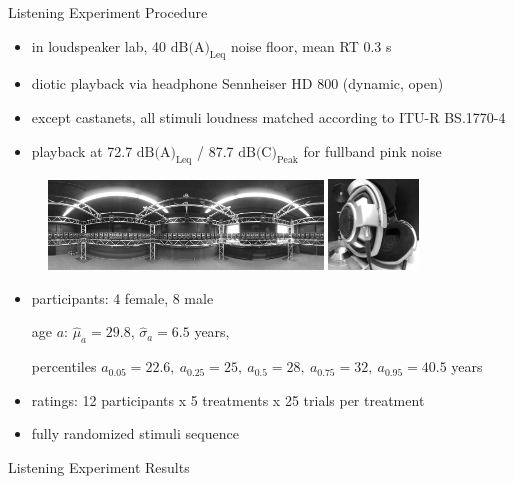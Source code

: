 \documentclass[mathserif]{intbeamer}
\begin{document}
\begin{frame}{Listening Experiment Procedure}
\begin{itemize}
\item in loudspeaker lab, 40 $\text{dB(A)}_\text{Leq}$ noise floor, mean RT 0.3 s
\item diotic playback via \textcolor{colnonzero}{headphone} Sennheiser HD 800 (dynamic, open)
\item except castanets, all stimuli loudness matched according to ITU-R BS.1770-4
\item playback at 72.7 $\text{dB(A)}_\text{Leq}$ / 87.7 $\text{dB(C)}_\text{Peak}$
for fullband pink noise
\end{itemize}
\begin{figure}
\includegraphics[width=0.65\textwidth]{graphics/URO_array_panorama_2}
\includegraphics[width=0.215\textwidth]{graphics/HD800_2}
\end{figure}
\begin{itemize}
\item participants: 4 female, 8 male
\begin{tiny}
age $a$: $\hat{\mu}_a=29.8$, $\hat{\sigma}_a=6.5$ years,

percentiles $a_{0.05}=22.6,~a_{0.25}=25,~a_{0.5}=28,~a_{0.75}=32,~a_{0.95}=40.5$ years
\end{tiny}
\item ratings: 12 participants x 5 treatments x 25 trials per treatment
\item fully randomized stimuli sequence
\end{itemize}
\end{frame}
%
%
%
\begin{frame}{Listening Experiment Results}
\end{frame}
%
%
%
\end{document}
